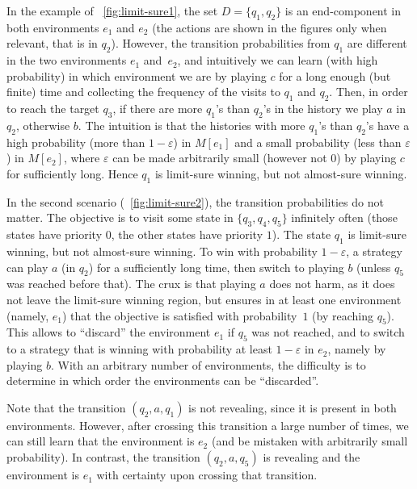 \documentclass[a4paper,USenglish,cleveref, autoref, thm-restate]{lipics-v2021}
\let\epsilon\varepsilon
\begin{document}
 In the example of \figurename~\ref{fig:limit-sure1},
the set $D = \{q_1,q_2\}$ is an end-component in both environments $e_1$ and $e_2$ (the actions are shown in the figures only
when relevant, that is in $q_2$). However, the transition probabilities from $q_1$
are different in the two environments $e_1$ and~$e_2$, and intuitively we can learn (with high probability) in 
which environment we are by playing $c$ for a long enough (but finite) time
and collecting the frequency of the visits to $q_1$ and $q_2$. 
Then, in order to reach the target $q_3$, if there are more $q_1$'s than $q_2$'s in the history we play $a$ in $q_2$,
otherwise $b$. The intuition is that 
the histories with more $q_1$'s than $q_2$'s have a high probability (more than $1-\epsilon$)
in $M[e_1]$ and a small probability (less than $\epsilon$) in $M[e_2]$,
where $\epsilon$ can be made arbitrarily small (however not $0$) 
by playing $c$ for sufficiently long. Hence $q_1$ is limit-sure winning,
but not almost-sure winning.



In the second scenario (\figurename~\ref{fig:limit-sure2}), the transition
probabilities do not matter. The objective is to visit some state in $\{q_3,q_4,q_5\}$
infinitely often (those states have priority $0$, the other states have priority $1$).
The state $q_1$ is limit-sure winning, but not almost-sure winning. 
To win with probability $1-\epsilon$, a strategy can play $a$ (in $q_2$) 
for a sufficiently long time, then switch to playing $b$ (unless $q_5$ was 
reached before that).
The crux is that playing $a$ does not harm, as it does not leave the limit-sure 
winning region, but ensures in at least one environment (namely, $e_1$)
that the objective is satisfied with probability~$1$ (by reaching $q_5$).
This allows to ``discard'' the environment $e_1$ if $q_5$ was not reached,
and to switch to a strategy that is winning with probability at least $1-\epsilon$ in $e_2$,
namely by playing $b$. 
With an arbitrary number of environments, the difficulty
is to determine in which order the environments can be ``discarded''.


Note that the transition $(q_2,a,q_1)$ is not revealing, since it is present in both environments.
However, after crossing this transition a large number of times, we can still learn that the environment 
is $e_2$ (and be mistaken with arbitrarily small probability).
In contrast, the transition $(q_2,a,q_5)$ is revealing and the environment is $e_1$ with certainty
upon crossing that transition.
\end{document}
